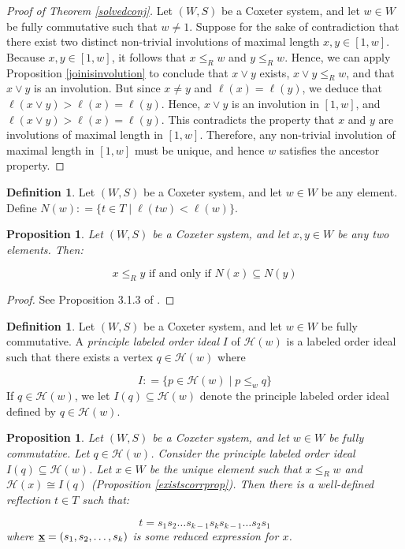 \documentclass{amsart}
\theoremstyle{plain} %
\newtheorem{prop}[thm]{Proposition}
\theoremstyle{definition}
\newtheorem{defi}[thm]{Definition}
\def\weakr{\leq_{R}}
\def\H#1{\mathcal{H}(#1)}
\begin{document}
\begin{proof}[Proof of Theorem \ref{solvedconj}]
    Let $ (W,S)$ be a Coxeter system, and let $ w\in W$ be fully commutative such that $ w\neq 1$. Suppose for the sake of contradiction that there exist two distinct non-trivial involutions of maximal length $ x, y\in [1,w]$. Because $ x,y\in [1,w]$, it follows that $ x\weakr w$ and $ y\weakr w$. Hence, we can apply Proposition \ref{joinisinvolution} to conclude that $ x\vee y$ exists, $ x\vee y \weakr w$, and that $ x\vee y$ is an involution. But since $ x\neq y$ and $ \ell(x) = \ell(y)$, we deduce that $ \ell(x\vee y) > \ell(x) = \ell(y)$. Hence, $ x\vee y$ is an involution in $ [1,w]$, and $\ell(x\vee y)> \ell(x) = \ell(y)$. This contradicts the property that $ x$ and $ y$ are involutions of maximal length in $ [1,w]$. Therefore, any non-trivial involution of maximal length in $ [1,w]$ must be unique, and hence $ w$ satisfies the ancestor property.
\end{proof}


\begin{defi}
Let $  (W,S)$ be a Coxeter system, and let $ w\in W$ be any element. Define $ N(w) : = \{ t\in T \mid \ell(tw) < \ell(w)  \}$.
\end{defi}

\begin{prop} \label{weakrequivreflcocycle}
    Let $ (W,S)$ be a Coxeter system, and let $ x,y\in W$ be any two elements. Then:

    $$ x\weakr y \textrm{ if and only if } N(x) \subseteq N(y)$$
\end{prop}

\begin{proof}
    See Proposition 3.1.3 of \cite{bjorner2005combinatorics}.
\end{proof}

\begin{defi}
    Let $ (W,S)$ be a Coxeter system, and let $ w\in W$ be fully commutative. A \emph{principle labeled order ideal} $I$ of $ \H{w}$ is a labeled order ideal such that there exists a vertex $ q \in \H{w}$ where

    $$ I : = \{ p \in \H{w} \mid  p \leq_{w} q  \}$$
    If $ q\in \H{w}$, we let $ I(q) \subseteq \H{w}$ denote the principle labeled order ideal defined by $ q\in \H{w}$.
\end{defi}

\begin{prop} \label{welldefreflection}
    Let $ (W,S )$ be a Coxeter system, and let $w\in W$ be fully commutative. Let $ q\in \H{w}$. Consider the principle labeled order ideal $I(q) \subseteq \H{w}$. Let $ x\in W$ be the unique element such that $ x \weakr w$ and $ \H{x} \cong I(q)$ (Proposition \ref{existscorrprop}). Then there is a well-defined reflection $ t\in T$ such that:

    $$ t = s_{1}s_{2} \dots s_{k-1}s_{k}s_{k-1}\dots s_{2}s_{1}$$
    where $ \textbf{\underline{x}} = (s_{1},s_{2}, \dots, s_{k})$ is some reduced expression for $ x$.
\end{prop}
\end{document}
